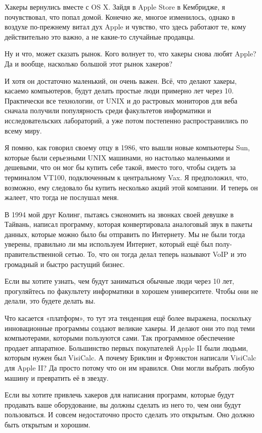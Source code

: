 \documentclass[ebook,12pt,oneside,openany]{memoir}
\begin{document}
Хакеры вернулись вместе с OS X. Зайдя в Apple Store в Кембридже, я
почувствовал, что попал домой. Конечно же, многое изменилось, однако в
воздухе по-прежнему витал дух Apple и чувство, что здесь работают те,
кому действительно это важно, а не какие-то случайные продавцы.

Ну и что, может сказать рынок. Кого волнует то, что хакеры снова любят
Apple? Да и вообще, насколько большой этот рынок хакеров?

И хотя он достаточно маленький, он очень важен. Всё, что делают
хакеры, касаемо компьютеров, будут делать простые люди примерно лет
через 10. Практически все технологии, от UNIX и до растровых мониторов
для веба сначала получили популярность среди факультетов информатики и
исследовательских лабораторий, а уже потом постепенно распространились
по всему миру.

Я помню, как говорил своему отцу в 1986, что вышли новые компьютеры
Sun, которые были серьезными UNIX машинами, но настолько маленькими и
дешевыми, что он мог бы купить себе такой, вместо того, чтобы сидеть
за терминалом VT100, подключенным к центральному Vax. Я предположил,
что, возможно, ему следовало бы купить несколько акций этой компании.
И теперь он жалеет, что тогда не послушал меня.

В 1994 мой друг Колинг, пытаясь сэкономить на звонках своей девушке в
Тайвань, написал программу, которая конвертировала аналоговый звук в
пакеты данных, которые можно было бы отправить по Интернету. Мы не
были тогда уверены, правильно ли мы используем Интернет, который ещё
был полу-правительственной сетью. То, что он тогда делал теперь
называют VoIP и это громадный и быстро растущий бизнес.

Если вы хотите узнать, чем будут заниматься обычные люди через 10 лет,
прогуляйтесь по факультету информатики в хорошем университете. Чтобы
они не делали, это будете делать вы.

Что касается «платформ», то тут эта тенденция ещё более выражена,
поскольку инновационные программы создают великие хакеры. И делают они
это под теми компьютерами, которыми пользуются сами. Так программное
обеспечение продает аппаратное. Большинство первых покупателей Apple
II были людьми, которым нужен был VisiCalc. А почему Бриклин и
Фрэнкстон написали VisiCalc для Apple II? Да просто потому что он им
нравился. Они могли выбрать любую машину и превратить её в звезду.

Если вы хотите привлечь хакеров для написания программ, которые будут
продавать ваше оборудование, вы должны сделать из него то, чем они
будут пользоваться. И совсем недостаточно просто сделать это открытым.
Оно должно быть открытым и хорошим.
\end{document}
